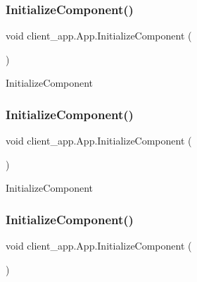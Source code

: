 \subsubsection{\texorpdfstring{InitializeComponent()}{InitializeComponent()}\hspace{0.1cm}{\footnotesize\ttfamily [1/4]}}
{\footnotesize\ttfamily void client\+\_\+app.\+App.\+Initialize\+Component (\begin{DoxyParamCaption}{ }\end{DoxyParamCaption})\hspace{0.3cm}{\ttfamily [inline]}}



Initialize\+Component 

\mbox{\label{classclient__app_1_1_app_ab1406ddeb1d09aa8432ce1372c9e5e3d}} 
\subsubsection{\texorpdfstring{InitializeComponent()}{InitializeComponent()}\hspace{0.1cm}{\footnotesize\ttfamily [2/4]}}
{\footnotesize\ttfamily void client\+\_\+app.\+App.\+Initialize\+Component (\begin{DoxyParamCaption}{ }\end{DoxyParamCaption})\hspace{0.3cm}{\ttfamily [inline]}}



Initialize\+Component 

\mbox{\label{classclient__app_1_1_app_ab1406ddeb1d09aa8432ce1372c9e5e3d}} 
\subsubsection{\texorpdfstring{InitializeComponent()}{InitializeComponent()}\hspace{0.1cm}{\footnotesize\ttfamily [3/4]}}
{\footnotesize\ttfamily void client\+\_\+app.\+App.\+Initialize\+Component (\begin{DoxyParamCaption}{ }\end{DoxyParamCaption})\hspace{0.3cm}{\ttfamily [inline]}}



